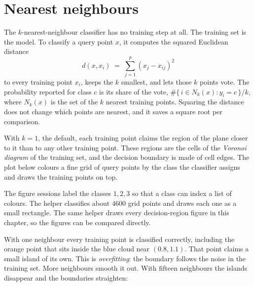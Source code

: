 
\section{Nearest neighbours}
\label{sec:ml-knn}

The \(k\)-nearest-neighbour classifier
has no training step at all. The training set is the model. To classify a query
point \(x\), it computes the squared Euclidean distance
\[
  d(x, x_i) \;=\; \sum_{j=1}^{p} (x_j - x_{ij})^2
\]
to every training point \(x_i\), keeps the \(k\) smallest, and lets those \(k\)
points vote. The probability reported for class \(c\) is its share of the vote,
\(\#\{\,i \in N_k(x) : y_i = c\,\}/k\), where \(N_k(x)\) is the set of the \(k\)
nearest training points. Squaring the distance does not change which points are
nearest, and it saves a square root per comparison.

With \(k=1\), the default, each training point claims the region of the plane
closer to it than to any other training point. These regions are the cells of the
\emph{Voronoi diagram} of the training set, and the decision
boundary is made of cell edges. The plot below colours a fine grid of query points
by the class the classifier assigns and draws the training points on top.


The figure sessions label the classes \(1, 2, 3\) so that a class can index a list
of colours. The helper  classifies about \(4600\) grid points and
draws each one as a small rectangle. The same helper draws every decision-region
figure in this chapter, so the figures can be compared directly.

With one neighbour every training point is classified correctly, including the
orange point that sits inside the blue cloud near \((0.8, 1.1)\). That point claims
a small island of its own. This is \emph{overfitting}: the
boundary follows the noise in the training set. More neighbours smooth it out.
With fifteen neighbours the islands disappear and the boundaries straighten:


